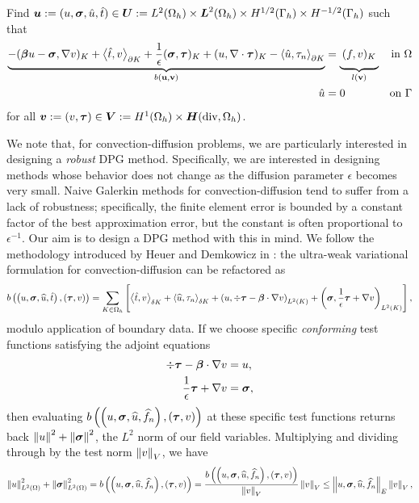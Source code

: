 \documentclass[Proposal.tex]{subfiles}
\begin{document}
Find
$\boldsymbol{u}:=(u,\boldsymbol\sigma,\hat u,\hat t)
\in\boldsymbol{U}:=L^2(\Omega_h)\times \boldsymbol{L}^2(\Omega_h)\times H^{1/2}(\Gamma_h)\times H^{-1/2}(\Gamma_h)$
such that
\begin{align}
\label{eq:variationalFormulation}
\underbrace{-(\bfbeta u-\bfsigma,\nabla v)_K+\LRa{\hat t,v}_{\partial K}
+ \frac{1}{\epsilon}(\bfsigma,\bftau)_K
+(u,\nabla\cdot\bftau)_K
-\LRa{\hat u,\tau_n}_{\partial K}}_{b(\mathbf{u}, \mathbf{v})}
&=\underbrace{\:(f,v)_K\genfrac{}{}{0pt}{}{}{}}_{l(\mathbf{v})} &\text{in }\Omega \\
\hat u&=0 &\text{on }\Gamma
\end{align}
for all $\boldsymbol{v}:=(v,\boldsymbol\tau)\in
\boldsymbol{V}:=H^1(\Omega_h)\times\mbox{\boldmath $H$}(\text{div},\Omega_h)$.


We note that, for convection-diffusion problems, we are particularly
interested in designing a \textit{robust} DPG method.  Specifically, we are
interested in designing methods whose behavior does not change as the
diffusion parameter $\epsilon$ becomes very small.  Naive Galerkin methods for
convection-diffusion tend to suffer from a lack of robustness; specifically,
the finite element error is bounded by a constant factor of the best
approximation error, but the constant is often proportional to
$\epsilon^{-1}$.  Our aim is to design a DPG method with this in mind.  We
follow the methodology introduced by Heuer and Demkowicz in
\cite{DemkowiczHeuer}: the ultra-weak variational formulation for
convection-diffusion can be refactored as
\[
b\left( \left( u,\boldsymbol\sigma,\widehat{u},\hat t \right),\left( \boldsymbol\tau,v \right) \right) =
\sum_{K\in \Omega_h}\left[ \left\langle \hat t,v \right\rangle_{\delta K}
+\left\langle \widehat{u},\tau_n \right\rangle_{\delta K} + \left( u,\div \boldsymbol\tau
-\boldsymbol\beta\cdot\nabla v \right)_{L^2(K)}
+\left( \boldsymbol\sigma,\frac{1}{\epsilon} \boldsymbol\tau + \nabla v \right)_{L^2(K)} \right],
\]
modulo application of boundary data.  If we choose specific
\textit{conforming} test functions satisfying the adjoint equations
\begin{align*}
\div \boldsymbol\tau - \boldsymbol\beta \cdot \nabla v &= u,\\
\frac{1}{\epsilon} \boldsymbol\tau + \nabla v &= \boldsymbol\sigma,
\end{align*}
then evaluating $b\left( \left( u,\boldsymbol\sigma,\widehat{u},\widehat{f}_n \right),\left( \boldsymbol\tau,v \right) \right)$ at these
specific test functions returns back $\left\| u \right\|^2 + \left\| \boldsymbol\sigma \right\|^2$, the $L^2$
norm of our field variables.  Multiplying and dividing through by the test
norm $\left\| v \right\|_V$, we have
\[
\left\| u \right\|_{L^2\left( \Omega \right)}^2 + \left\| \boldsymbol\sigma \right\|_{L^2\left( \Omega \right)}^2 =
b\left( \left( u,\boldsymbol\sigma,\widehat{u},\widehat{f}_n \right),\left( \boldsymbol\tau,v \right) \right) =
\frac{b\left( \left( u,\boldsymbol\sigma,\widehat{u},\widehat{f}_n \right),\left( \boldsymbol\tau,v \right) \right)}{\left\| v \right\|_V}\left\| v \right\|_V
\leq \left\| u,\boldsymbol\sigma,\widehat{u},\widehat{f}_n \right\|_E\left\| v \right\|_V,
\]
\end{document}
